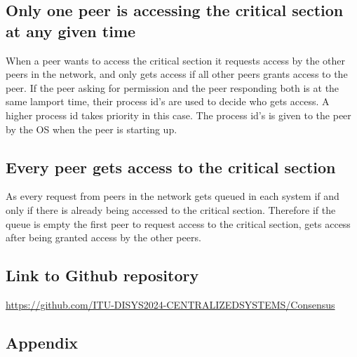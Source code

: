 \documentclass[a4paper,11pt]{article}
\begin{document}
\subsection*{Only one peer is accessing the critical section at any given time}
When a peer wants to access the critical section it requests access by the other peers in the network, and only gets access if all other peers grants access to the peer.
If the peer asking for permission and the peer responding both is at the same lamport time, their process id's are used to decide who gets access. A higher process id takes priority in this case.
The process id's is given to the peer by the OS when the peer is starting up.

\subsection*{Every peer gets access to the critical section}
As every request from peers in the network gets queued in each system if and only if there is already being accessed to the critical section. 
Therefore if the queue is empty the first peer to request access to the critical section, gets access after being granted access by the other peers.


\newpage
\subsection*{Link to Github repository}

\href{https://github.com/ITU-DISYS2024-CENTRALIZEDSYSTEMS/Consensus}{https://github.com/ITU-DISYS2024-CENTRALIZEDSYSTEMS/Consensus}

\subsection*{Appendix}
\end{document}
